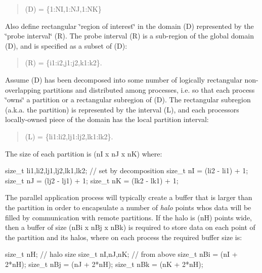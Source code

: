 \begin{quote}
(D) = \{1\+:NI,1\+:NJ,1\+:NK\} \end{quote}




Also define rectangular \char`\"{}region of interest\char`\"{} in the domain (D) represented by the \char`\"{}probe interval\char`\"{} (R). The probe interval (R) is a sub-\/region of the global domain (D), and is specified as a subset of (D)\+:

\begin{quote}
(R) = \{i1\+:i2,j1\+:j2,k1\+:k2\}. \end{quote}


Assume (D) has been decomposed into some number of logically rectangular non-\/overlapping partitions and distributed among processes, i.\+e. so that each process \char`\"{}owns\char`\"{} a partition or a rectangular subregion of (D). The rectangular subregion (a.\+k.\+a. the partition) is represented by the interval (L), and each processor\textquotesingle{}s locally-\/owned piece of the domain has the local partition interval\+:

\begin{quote}
(L) = \{li1\+:li2,lj1\+:lj2,lk1\+:lk2\}. \end{quote}




The size of each partition is (nI x nJ x nK) where\+:


\begin{DoxyCode}
\textcolor{keywordtype}{size\_t} li1,li2,lj1,lj2,lk1,lk2; \textcolor{comment}{// set by decomposition}
\textcolor{keywordtype}{size\_t} nI = (li2 - li1) + 1;  
\textcolor{keywordtype}{size\_t} nJ = (lj2 - lj1) + 1;  
\textcolor{keywordtype}{size\_t} nK = (lk2 - lk1) + 1; 
\end{DoxyCode}


The parallel application process will typically create a buffer that is larger than the partition in order to encapsulate a number of {\itshape halo} points who\textquotesingle{}s data will be filled by communication with remote partitions. If the halo is (nH) points wide, then a buffer of size (n\+Bi x n\+Bj x n\+Bk) is required to store data on each point of the partition and its halos, where on each process the required buffer size is\+:


\begin{DoxyCode}
\textcolor{keywordtype}{size\_t} nH;               \textcolor{comment}{// halo size}
\textcolor{keywordtype}{size\_t} nI,nJ,nK;         \textcolor{comment}{// from above}
\textcolor{keywordtype}{size\_t} nBi = (nI + 2*nH);
\textcolor{keywordtype}{size\_t} nBj = (nJ + 2*nH);
\textcolor{keywordtype}{size\_t} nBk = (nK + 2*nH);
\end{DoxyCode}


